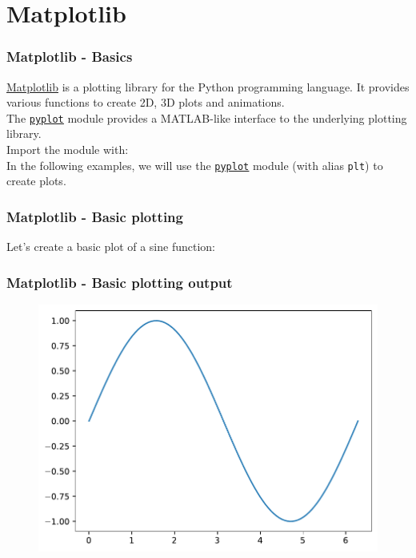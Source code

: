 \documentclass{beamer}
\newcommand{\hrefu}[2]{\underline{\href{#1}{#2}}}
\begin{document}
\section{Matplotlib}
\begin{frame}
  \frametitle{Matplotlib - Basics}
  \hrefu{https://matplotlib.org/}{Matplotlib} is a plotting library for the Python programming language. It provides various functions to create 2D, 3D plots and animations.\\
  The \hrefu{https://matplotlib.org/api/pyplot_summary.html}{\texttt{pyplot}} module provides a MATLAB-like interface to the underlying plotting library.\\
  \vspace{5mm}
  Import the module with: \\

  
  In the following examples, we will use the \hrefu{https://matplotlib.org/api/pyplot_summary.html}{\texttt{pyplot}} module (with alias \texttt{plt}) to create plots.\\

\end{frame}
\begin{frame}
  \frametitle{Matplotlib - Basic plotting}
  Let's create a basic plot of a sine function:
  
\end{frame}

\begin{frame}
  \frametitle{Matplotlib - Basic plotting output}
  \begin{figure}[H]
    \centering
    \begin{samepage}
        \includegraphics[width=0.7\linewidth]{fig/matplotlib0.pdf}
    \end{samepage}
\end{figure}
\end{frame}
\end{document}

